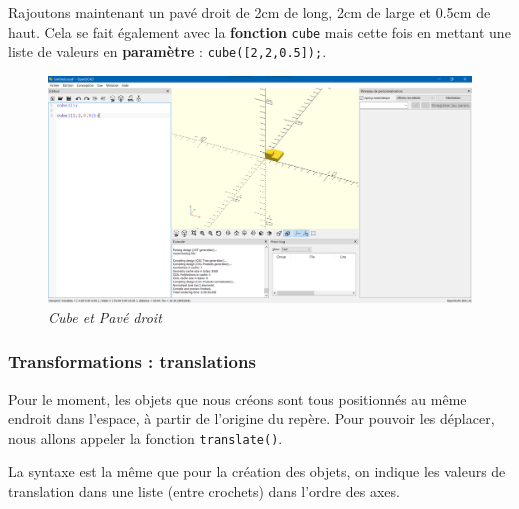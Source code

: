 Rajoutons maintenant un pavé droit de 2cm de long, 2cm de large et 0.5cm de haut.
Cela se fait également avec la \textbf{fonction} \verb|cube| mais cette fois en mettant une liste de valeurs en \textbf{paramètre} : \verb|cube([2,2,0.5]);|.

\begin{figure}[ht]
	\centering
	\includegraphics[width=12cm]{images/cube_2-2-05}
	\caption{\textit{Cube et Pavé droit}}
\end{figure}




\subsubsection{Transformations : translations}

Pour le moment, les objets que nous créons sont tous positionnés au même endroit dans l'espace, à partir de l'origine du repère.
Pour pouvoir les déplacer, nous allons appeler la fonction \verb|translate()|.

La syntaxe est la même que pour la création des objets, on indique les valeurs de translation dans une liste (entre crochets) dans l'ordre des axes.

\vspace{12pt}

